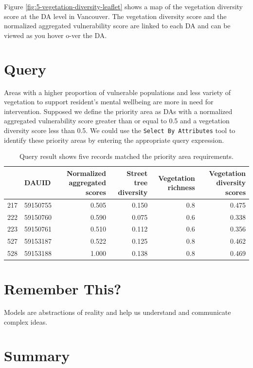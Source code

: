 \documentclass[
]{book}
\begin{document}
Figure \ref{fig:5-vegetation-diversity-leaflet} shows a map of the vegetation diversity score at the DA level in Vancouver. The vegetation diversity score and the normalized aggregated vulnerability score are linked to each DA and can be viewed as you hover o-ver the DA.

\hypertarget{query}{%
\section{Query}\label{query}}

Areas with a higher proportion of vulnerable populations and less variety of vegetation to support resident's mental wellbeing are more in need for intervention. Supposed we define the priority area as DAs with a normalized aggregated vulnerability score greater than or equal to 0.5 and a vegetation diversity score less than 0.5. We could use the \texttt{Select\ By\ Attributes} tool to identify these priority areas by entering the appropriate query expression.

\begin{table}

\caption{\label{tab:5-case-study-9}Query result shows five records matched the priority area requirements.}
\centering
\begin{tabular}[t]{llrrrr}
\toprule
  & DAUID & Normalized aggregated scores & Street tree diversity & Vegetation richness & Vegetation diversity scores\\
\midrule
217 & 59150755 & 0.505 & 0.150 & 0.8 & 0.475\\
222 & 59150760 & 0.590 & 0.075 & 0.6 & 0.338\\
223 & 59150761 & 0.510 & 0.112 & 0.6 & 0.356\\
527 & 59153187 & 0.522 & 0.125 & 0.8 & 0.462\\
528 & 59153188 & 1.000 & 0.138 & 0.8 & 0.469\\
\bottomrule
\end{tabular}
\end{table}

\hypertarget{remember-this}{%
\section*{Remember This?}\label{remember-this}}

Models are abstractions of reality and help us understand and communicate complex ideas.

\hypertarget{summary-4}{%
\section{Summary}\label{summary-4}}
\end{document}
